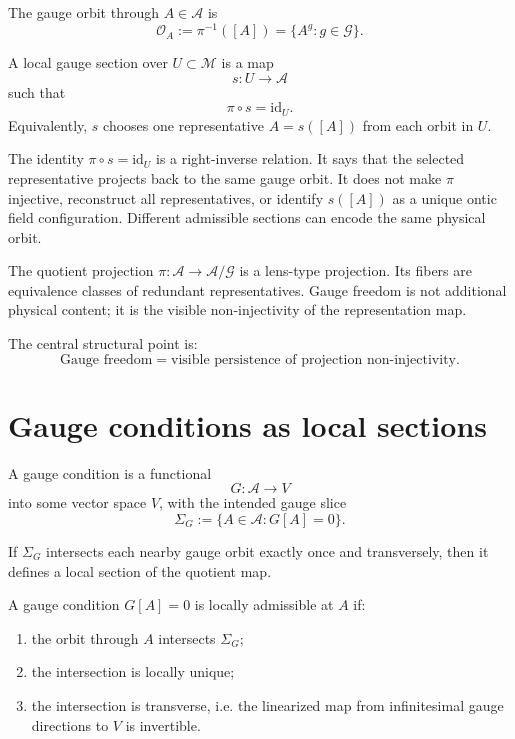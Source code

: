 \documentclass[11pt]{article}
\newcommand{\A}{\mathcal A}
\newcommand{\G}{\mathcal G}
\newcommand{\M}{\mathcal M}
\newcommand{\id}{\mathrm{id}}
\begin{document}
\begin{definition}
The gauge orbit through \(A\in\A\) is
\[
\mathcal O_A:=\pi^{-1}([A])=\{A^g:g\in\G\}.
\]
\end{definition}

\begin{definition}
A local gauge section over \(U\subset\M\) is a map
\[
s:U\to\A
\]
such that
\[
\pi\circ s=\id_U.
\]
Equivalently, \(s\) chooses one representative \(A=s([A])\) from each orbit in \(U\).
\end{definition}

\begin{remark}
The identity \(\pi\circ s=\id_U\) is a right-inverse relation.  It says that
the selected representative projects back to the same gauge orbit.  It does
not make \(\pi\) injective, reconstruct all representatives, or identify
\(s([A])\) as a unique ontic field configuration.  Different admissible
sections can encode the same physical orbit.
\end{remark}

\begin{remark}
The quotient projection \(\pi:\A\to\A/\G\) is a lens-type projection. Its fibers are equivalence classes of redundant representatives. Gauge freedom is not additional physical content; it is the visible non-injectivity of the representation map.
\end{remark}

The central structural point is:
\[
\boxed{\text{Gauge freedom}=\text{visible persistence of projection non-injectivity}.}
\]

\section{Gauge conditions as local sections}

A gauge condition is a functional
\[
G:\A\to V
\]
into some vector space \(V\), with the intended gauge slice
\[
\Sigma_G:=\{A\in\A:G[A]=0\}.
\]

If \(\Sigma_G\) intersects each nearby gauge orbit exactly once and transversely, then it defines a local section of the quotient map.

\begin{definition}
A gauge condition \(G[A]=0\) is locally admissible at \(A\) if:
\begin{enumerate}
\item the orbit through \(A\) intersects \(\Sigma_G\);
\item the intersection is locally unique;
\item the intersection is transverse, i.e. the linearized map from infinitesimal gauge directions to \(V\) is invertible.
\end{enumerate}
\end{definition}
\end{document}
